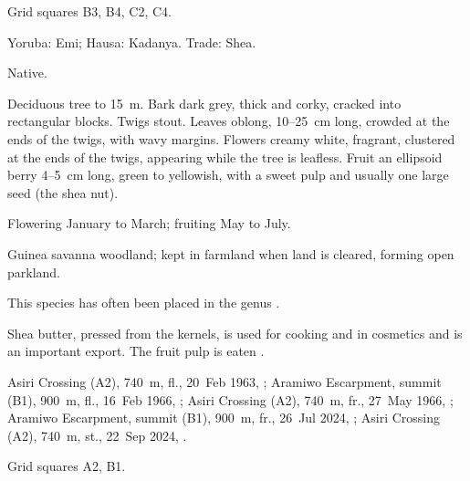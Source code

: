  Grid squares B3, B4, C2, C4.

\begin{center}
\end{center}

\label{sp:SAP02}

 Yoruba: Emi; Hausa: Kadanya. Trade:
Shea.

 Native.

 Deciduous tree to 15~m. Bark dark grey, thick and
corky, cracked into rectangular blocks. Twigs stout. Leaves oblong,
10--25~cm long, crowded at the ends of the twigs, with wavy margins.
Flowers creamy white, fragrant, clustered at the ends of the twigs,
appearing while the tree is leafless. Fruit an ellipsoid berry
4--5~cm long, green to yellowish, with a sweet pulp and usually one
large seed (the shea nut).

 Flowering January to March; fruiting May to July.

 Guinea savanna woodland; kept in farmland when land is
cleared, forming open parkland.

 This species has often been placed in the genus
.

 Shea butter, pressed from the kernels, is used for
cooking and in cosmetics and is an important export. The fruit pulp is
eaten \citep{arbonnier2004,orwa2009}.

 Asiri Crossing (A2), 740~m, fl., 20~Feb 1963, ;
Aramiwo Escarpment, summit (B1), 900~m, fl., 16~Feb 1966, ;
Asiri Crossing (A2), 740~m, fr., 27~May 1966, ;
Aramiwo Escarpment, summit (B1), 900~m, fr., 26~Jul 2024, ;
Asiri Crossing (A2), 740~m, st., 22~Sep 2024, .

 Grid squares A2, B1.

\begin{center}
\end{center}